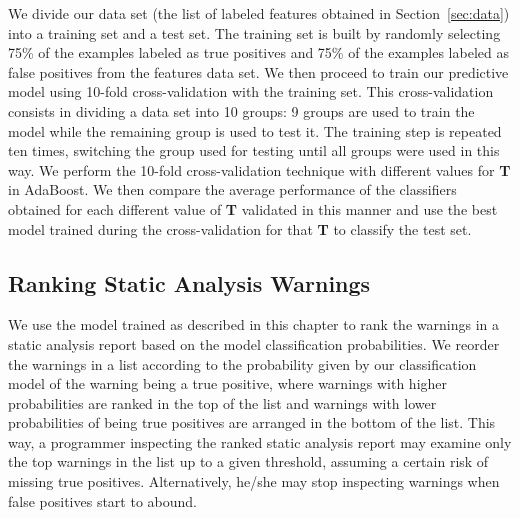 We divide our data set (the list of labeled features obtained in
Section~\ref{sec:data}) into a training set and a test set. The training set is
built by randomly selecting 75\% of the examples labeled as true positives and
75\% of the examples labeled as false positives from the features data set. We
then proceed to train our predictive model using 10-fold cross-validation
with the training set. This cross-validation consists in dividing a data set
into 10 groups: 9 groups are used to train the model while the remaining group is
used to test it. The training step is repeated ten times, switching the group
used for testing until all groups were used in this way.  We perform the
10-fold cross-validation technique with different values for \textbf{T} in
AdaBoost. We then compare the average performance of the classifiers obtained for
each different value of \textbf{T} validated in this manner and use the best
model trained during the cross-validation for that \textbf{T} to classify the
test set.

\subsection{Ranking Static Analysis Warnings}
\label{subsec:ranking}

We use the model trained as described in this chapter to rank the warnings in a
static analysis report based on the model classification probabilities. We
reorder the warnings in a list according to the probability given by our
classification model of the warning being a true positive, where warnings with
higher probabilities are ranked in the top of the list and warnings with lower
probabilities of being true positives are arranged in the bottom of the list.
This way, a programmer inspecting the ranked static analysis report may examine
only the top warnings in the list up to a given threshold, assuming a certain
risk of missing true positives. Alternatively, he/she may stop inspecting
warnings when false positives start to abound.

